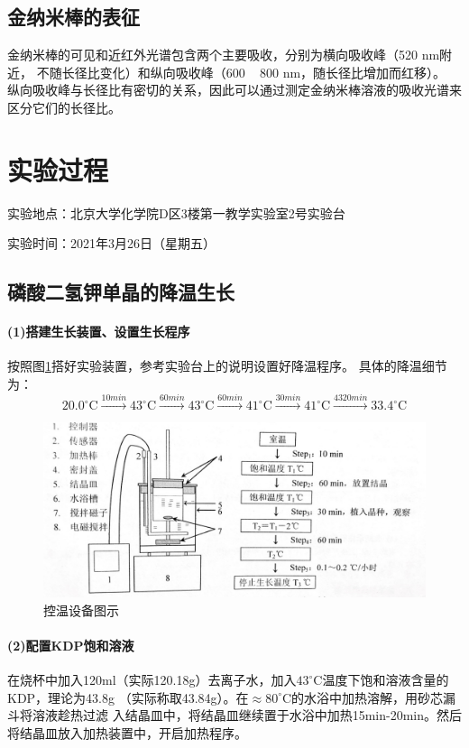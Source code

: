 \documentclass[a4paper,zihao=5,UTF8]{ctexart}
\newcommand{\mr}[1]{\mathrm{#1}}
\def\celsius{^{\circ}\mr{C}}
\begin{document}
    \subsection{金纳米棒的表征}
    金纳米棒的可见和近红外光谱包含两个主要吸收，分别为横向吸收峰（520 nm附近，
    不随长径比变化）和纵向吸收峰（600 ~ 800 nm，随长径比增加而红移）。
    纵向吸收峰与长径比有密切的关系，因此可以通过测定金纳米棒溶液的吸收光谱来区分它们的长径比。

    \section{实验过程}
    实验地点：北京大学化学院D区3楼第一教学实验室2号实验台
	\par 
	实验时间：2021年3月26日（星期五）
    \subsection{磷酸二氢钾单晶的降温生长}
    \paragraph{(1)搭建生长装置、设置生长程序}
    按照图\ref{jiangwenshebei}搭好实验装置，参考实验台上的说明设置好降温程序。
    具体的降温细节为：
    $$
    20.0\celsius\stackrel{10min}{\longrightarrow}43\celsius\stackrel{60min}{\longrightarrow}
    43\celsius\stackrel{60min}{\longrightarrow}41\celsius\stackrel{30min}{\longrightarrow}
    41\celsius\stackrel{4320min}{\longrightarrow}33.4\celsius
    $$
    \begin{figure}[htbp]
        \centering
        \includegraphics[scale=1.0]{jiangwenshebei.png}
        \caption{控温设备图示}
        \label{jiangwenshebei}
    \end{figure}
    \paragraph{(2)配置KDP饱和溶液}
    在烧杯中加入120ml（实际120.18g）去离子水，加入$43\celsius$温度下饱和溶液含量的KDP，理论为43.8g
    （实际称取43.84g）。在$\approx 80\celsius$的水浴中加热溶解，用砂芯漏斗将溶液趁热过滤
    入结晶皿中，将结晶皿继续置于水浴中加热15min-20min。然后将结晶皿放入加热装置中，开启加热程序。
\end{document}
